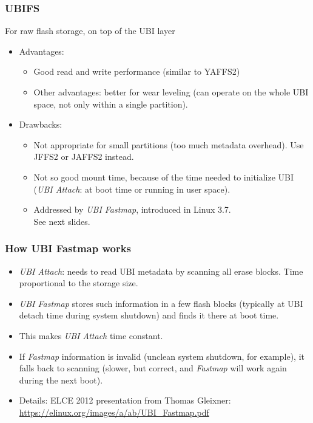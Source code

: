 \begin{frame}
\frametitle{UBIFS}
For raw flash storage, on top of the UBI layer
\begin{itemize}
\item Advantages:
      \begin{itemize}
      \item Good read and write performance (similar to YAFFS2)
      \item Other advantages: better for wear leveling (can operate on the
	    whole UBI space, not only within a single partition).
      \end{itemize}
\item Drawbacks:
      \begin{itemize}
      \item Not appropriate for small partitions (too much metadata
	    overhead). Use JFFS2 or JAFFS2 instead.
      \item Not so good mount time, because of the time needed
            to initialize UBI ({\em UBI Attach}: at boot time or running
             in user space).
      \item Addressed by {\em UBI Fastmap}, introduced in Linux 3.7. \\
            See next slides.
      \end{itemize}
\end{itemize}
\end{frame}

\begin{frame}
\frametitle{How UBI Fastmap works}
\begin{itemize}
\item {\em UBI Attach}: needs to read UBI metadata by
      scanning all erase blocks. Time proportional
      to the storage size.
\item {\em UBI Fastmap} stores such information in a few flash
      blocks (typically at UBI detach time during system
      shutdown) and finds it there at boot time.
\item This makes {\em UBI Attach} time constant.
\item If {\em Fastmap} information is invalid (unclean system
      shutdown, for example), it falls back to scanning
      (slower, but correct, and {\em Fastmap} will work again
      during the next boot).
\item Details: ELCE 2012 presentation from Thomas Gleixner:
      \url{https://elinux.org/images/a/ab/UBI_Fastmap.pdf}
\end{itemize}
\end{frame}

